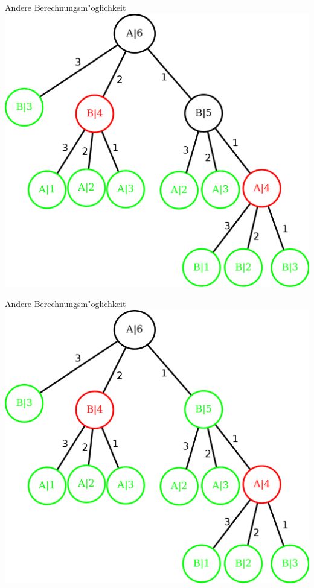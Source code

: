 \documentclass[18pt]{beamer}
\begin{document}
\begin{frame}{Andere Berechnungsm"oglichkeit}
\includegraphics[scale=0.4]{baum6.png}
\end{frame}

\begin{frame}{Andere Berechnungsm"oglichkeit}
\includegraphics[scale=0.4]{baum7.png}
\end{frame}
\end{document}
